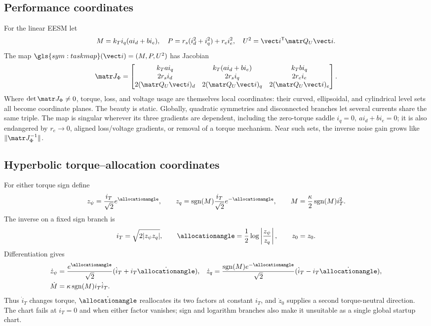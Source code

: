 \subsection{Performance coordinates}

For the linear EESM let
\[
 M=k_Ti_q(ai_d+bi_e),\quad
 P=r_s(i_d^2+i_q^2)+r_ei_e^2,\quad
 U^2=\vect i^{\mathsf T}\matr Q_U\vect i.
\]
The map \(\gls{sym:taskmap}(\vect i)=(M,P,U^2)\) has Jacobian
\begin{equation}
 \matr J_\Phi=
 \begin{bmatrix}
 k_Tai_q & k_T(ai_d+bi_e) & k_Tbi_q\\
 2r_si_d&2r_si_q&2r_ei_e\\
 2(\matr Q_U\vect i)_d&2(\matr Q_U\vect i)_q&
 2(\matr Q_U\vect i)_e
 \end{bmatrix}.
 \label{eq:performance-jacobian}
\end{equation}
Where \(\det\matr J_\Phi\neq0\), torque, loss, and voltage usage are themselves
local coordinates: their curved, ellipsoidal, and cylindrical level sets all
become coordinate planes. The beauty is static. Globally, quadratic symmetries
and disconnected branches let several currents share the same triple. The map
is singular wherever its three gradients are dependent, including the
zero-torque saddle \(i_q=0,\ ai_d+bi_e=0\); it is also endangered by
\(r_e\to0\), aligned loss/voltage gradients, or removal of a torque mechanism.
Near such sets, the inverse noise gain grows like
\(\|\matr J_\Phi^{-1}\|\).

\subsection{Hyperbolic torque--allocation coordinates}

For either torque sign define
\begin{equation}
 z_\psi=\frac{i_T}{\sqrt2}e^{\allocationangle},\qquad
 z_q=\operatorname{sgn}(M)\frac{i_T}{\sqrt2}e^{-\allocationangle},\qquad
 M=\frac{\kappa}{2}\operatorname{sgn}(M)i_T^2.
 \label{eq:signed-hyperbolic-chart}
\end{equation}
The inverse on a fixed sign branch is
\[
 i_T=\sqrt{2|z_\psi z_q|},\qquad
 \allocationangle=\frac12\log\left|\frac{z_\psi}{z_q}\right|,\qquad z_0=z_0.
\]
Differentiation gives
\begin{align}
 \dot z_\psi&=\frac{e^{\allocationangle}}{\sqrt2}
  (\dot i_T+i_T\dot{\allocationangle}),&
 \dot z_q&=\frac{\operatorname{sgn}(M)e^{-\allocationangle}}{\sqrt2}
  (\dot i_T-i_T\dot{\allocationangle}),\\
 \dot M&=\kappa\operatorname{sgn}(M)i_T\dot i_T.
 \label{eq:hyperbolic-rates-representation}
\end{align}
Thus \(\dot i_T\) changes torque, \(\dot{\allocationangle}\) reallocates its two factors at
constant \(i_T\), and \(\dot z_0\) supplies a second torque-neutral direction.
The chart fails at \(i_T=0\) and when either factor vanishes; sign and logarithm
branches also make it unsuitable as a single global startup chart.

